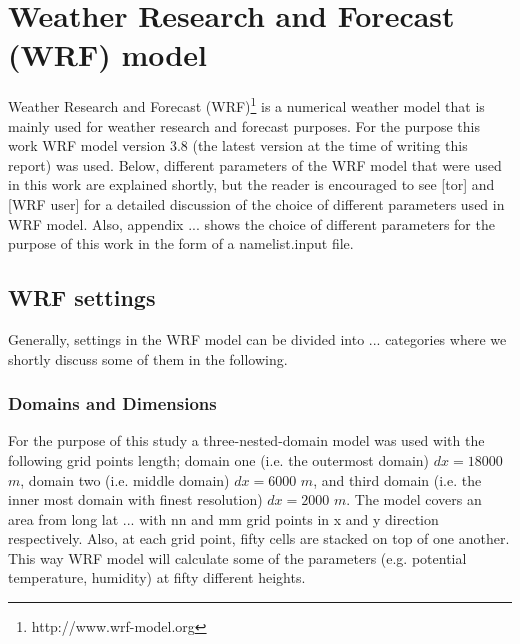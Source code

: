 \documentclass[a4paper,12pt]{article}
\numberwithin{equation}{section} %
\begin{document}
\newpage

\section{Weather Research and Forecast (WRF) model}

Weather Research and Forecast (WRF)\footnote{http://www.wrf-model.org} is a numerical weather model that is mainly used for weather research and forecast purposes. 
For the purpose this work WRF model version 3.8 (the latest version at the time of writing this report) was used. Below, different parameters of the WRF model that were used in this work are explained shortly, but the reader is encouraged to see [tor] and [WRF user] for a detailed discussion of the choice of different parameters used in WRF model. Also, appendix ... shows the choice of different parameters for the purpose of this work in the form of a namelist.input file. 


\subsection{WRF settings}
Generally, settings in the WRF model can be divided into ... categories where we shortly discuss some of them in the following.

\subsubsection{Domains and Dimensions}
For the purpose of this study a three-nested-domain model was used with the following grid points length; domain one (i.e. the outermost domain) $dx = 18000$ $m$, domain two (i.e. middle domain) $dx = 6000$ $m$, and third domain (i.e. the inner most domain with finest resolution) $dx = 2000$ $m$. The model covers an area from long lat ... with nn and mm grid points in x and y direction respectively. Also, at each grid point, fifty cells are stacked on top of one another. This way WRF model will calculate some of the parameters (e.g. potential temperature, humidity) at fifty different heights.
\end{document}
